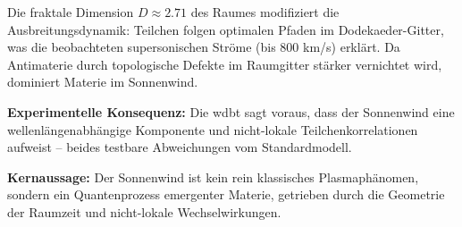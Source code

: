Die fraktale Dimension $D \approx 2.71$ des Raumes modifiziert die Ausbreitungsdynamik: Teilchen folgen optimalen Pfaden im Dodekaeder-Gitter, was die beobachteten supersonischen
Ströme (bis 800 km/s) erklärt. Da Antimaterie durch topologische Defekte im Raumgitter stärker vernichtet wird, dominiert Materie im Sonnenwind.

\textbf{Experimentelle Konsequenz:} Die \gls{wdbt} sagt voraus, dass der Sonnenwind eine wellenlängenabhängige Komponente und nicht-lokale Teilchenkorrelationen aufweist – beides
testbare Abweichungen vom Standardmodell.

\textbf{Kernaussage:} Der Sonnenwind ist kein rein klassisches Plasmaphänomen, sondern ein Quantenprozess emergenter Materie, getrieben durch die Geometrie der Raumzeit und
nicht-lokale Wechselwirkungen.
